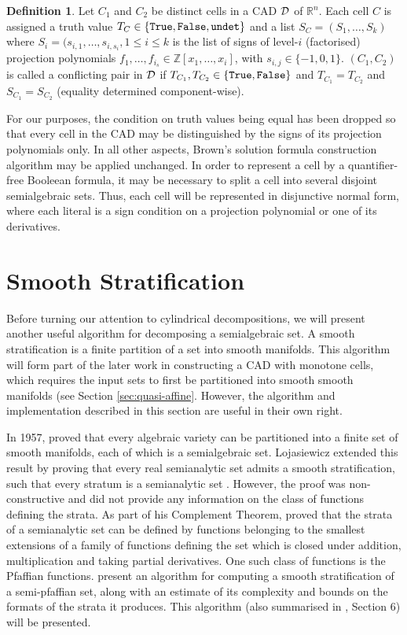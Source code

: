 \documentclass[
]{book}
\theoremstyle{definition}
\newtheorem{definition}{Definition}[chapter]
\theoremstyle{definition}
\theoremstyle{definition}
\theoremstyle{definition}
\theoremstyle{remark}
\begin{document}
\begin{definition}
Let \(C_1\) and \(C_2\) be distinct cells in a CAD \(\cal D\) of \(\mathbb{R}^n\). Each cell \(C\) is assigned a truth value \(T_C \in \{\tt{True}, \tt{False}, \tt{undet}\}\) and a list \(S_C = (S_1,\ldots,S_k)\) where \(S_i = (s_{i,1},\ldots,s_{i,s_i}, 1\le i \le k\) is the list of signs of level-\(i\) (factorised) projection polynomials \(f_1,\ldots,f_{i_s} \in \mathbb{Z}[x_1,\ldots,x_i]\), with \(s_{i,j} \in \{-1,0,1\}\).
\((C_1, C_2)\) is called a conflicting pair in \(\cal D\) if \(T_{C_1}, T_{C_2} \in \{\tt{True}, \tt{False}\}\) and \(T_{C_1} = T_{C_2}\) and \(S_{C_1} = S_{C_2}\) (equality determined component-wise).
\end{definition}

For our purposes, the condition on truth values being equal has been dropped so that every cell in the CAD may be distinguished by the signs of its projection polynomials only. In all other aspects, Brown's solution formula construction algorithm may be applied unchanged. In order to represent a cell by a quantifier-free Booleean formula, it may be necessary to split a cell into several disjoint semialgebraic sets. Thus, each cell will be represented in disjunctive normal form, where each literal is a sign condition on a projection polynomial or one of its derivatives.

\hypertarget{sec:smooth-strat}{%
\chapter{Smooth Stratification}\label{sec:smooth-strat}}

Before turning our attention to cylindrical decompositions, we will present another useful algorithm for decomposing a semialgebraic set.
A smooth stratification is a finite partition of a set into smooth manifolds.
This algorithm will form part of the later work in constructing a CAD with monotone cells, which requires the input sets to first be partitioned into smooth smooth manifolds (see Section \ref{sec:quasi-affine}. However, the algorithm and implementation described in this section are useful in their own right.

In 1957, \citet{whitney1992} proved that every algebraic variety can be partitioned into a finite set of smooth manifolds, each of which is a semialgebraic set.
Lojasiewicz extended this result by proving that every real semianalytic set admits a smooth stratification, such that every stratum is a semianalytic set \citep{lojasiewicz1964}. However, the proof was non-constructive and did not provide any information on the class of functions defining the strata.
As part of his Complement Theorem, \citet{gabrielov1996} proved that the strata of a semianalytic set can be defined by functions belonging to the smallest extensions of a family of functions defining the set which is closed under addition, multiplication and taking partial derivatives. One such class of functions is the Pfaffian functions.
\citet{gv1995} present an algorithm for computing a smooth stratification of a semi-pfaffian set, along with an estimate of its complexity and bounds on the formats of the strata it produces. This algorithm (also summarised in \citet{gv04}, Section 6) will be presented.
\end{document}
